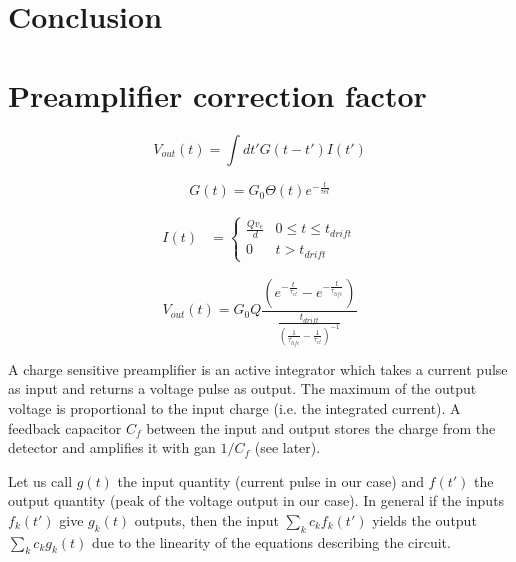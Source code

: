 \documentclass[a4paper,11pt]{article}
\begin{document}
\section{Conclusion}


\section{Preamplifier correction factor}
\begin{equation}
V_{out} (t) = \int dt' G(t-t') I(t') 
\end{equation}

\begin{equation}
G(t) = G_0 \Theta(t) e^{-\frac{t}{\tau{el}}}
\end{equation}

\begin{align}
 I(t) &=
  \begin{cases}
   \frac{Q v_e}{d}        & 0 \leq t \leq t_{drift} \\
   0        			& t > t_{drift}
  \end{cases}
 \end{align}

\begin{equation}
V_{out}(t) = G_0 Q \frac{
\left(e^{-\frac{t}{\tau_{el}}}-e^{-\frac{t}{\tau_{life}}}\right)
}{
\frac{t_{drift}}{\left (\frac{1}{\tau_{life}}-\frac{1}{\tau_{el}}\right )^{-1}}
}
\end{equation}


A charge sensitive preamplifier is an active integrator which takes a current pulse as input and returns a voltage pulse as output. The maximum of the output voltage is proportional to the input charge (i.e. the integrated current). A feedback capacitor $C_f$ between the input and output stores the charge from the detector and amplifies it with gan $1/C_f$ (see later). 

Let us call $g(t)$ the input quantity (current pulse in our case) and $f(t')$ the output quantity (peak of the voltage output in our case). 
In general if the inputs $f_k(t')$ give $g_k(t)$ outputs, then the input $\sum_k c_k f_k (t')$ yields the output $\sum_k c_k g_k (t)$ due to the linearity of the equations describing the circuit. 
\end{document}
